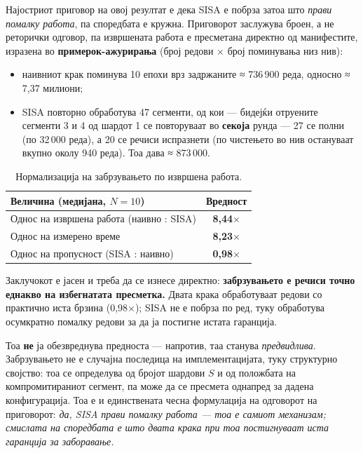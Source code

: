 Најостриот приговор на овој резултат е дека SISA е побрза затоа што \emph{прави помалку работа},
па споредбата е кружна. Приговорот заслужува броен, а не реторички одговор, па извршената
работа е пресметана директно од манифестите, изразена во \textbf{примерок-ажурирања} (број редови
× број поминувања низ нив):

\begin{itemize}
  \item наивниот крак поминува 10 епохи врз задржаните ≈ 736\,900 реда, односно ≈ 7,37 милиони;
  \item SISA повторно обработува 47 сегменти, од кои --- бидејќи отруените сегменти 3 и 4 од шардот 1 се повторуваат во \textbf{секоја} рунда --- 27 се полни (по 32\,000 реда), а 20 се речиси испразнети (по чистењето во нив остануваат вкупно околу 940 реда). Тоа дава ≈ 873\,000.
\end{itemize}

\begin{table}[htbp]
\centering
\caption{Нормализација на забрзувањето по извршена работа.}
\label{tab:work-normalized}
\begin{tabular}{lc}
\toprule
Величина (медијана, $N = 10$) & Вредност \\
\midrule
Однос на извршена работа (наивно : SISA) & \textbf{8,44$\times$} \\
Однос на измерено време & \textbf{8,23$\times$} \\
Однос на пропусност (SISA : наивно) & \textbf{0,98$\times$} \\
\bottomrule
\end{tabular}
\end{table}

Заклучокот е јасен и треба да се изнесе директно: \textbf{забрзувањето е речиси точно еднакво на
избегнатата пресметка.} Двата крака обработуваат редови со практично иста брзина (0,98×);
SISA не е побрза по ред, туку обработува осумкратно помалку редови за да ја постигне истата
гаранција.

Тоа \textbf{не} ја обезвреднува предноста --- напротив, таа станува \emph{предвидлива}. Забрзувањето не
е случајна последица на имплементацијата, туку структурно својство: тоа се определува од
бројот шардови $S$ и од положбата на компромитираниот сегмент, па може да се пресмета
однапред за дадена конфигурација. Тоа е и единствената чесна формулација на одговорот на
приговорот: \emph{да, SISA прави помалку работа --- тоа е самиот механизам; смислата на споредбата
е што двата крака при тоа постигнуваат иста гаранција за заборавање.}

